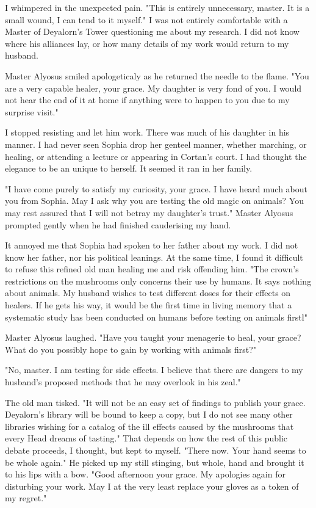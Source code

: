 \documentclass{article}
\begin{document}
I whimpered in the unexpected pain. "This is entirely unnecessary, master. It is a small wound, I can tend to it myself." I was not entirely comfortable with a Master of Deyalorn's Tower questioning me about my research. I did not know where his alliances lay, or how many details of my work would return to my husband.

Master Alyosus smiled apologeticaly as he returned the needle to the flame. "You are a very capable healer, your grace. My daughter is very fond of you. I would not hear the end of it at home if anything were to happen to you due to my surprise visit."

I stopped resisting and let him work. There was much of his daughter in his manner. I had never seen Sophia drop her genteel manner, whether marching, or healing, or attending a lecture or appearing in Cortan's court. I had thought the elegance to be an unique to herself. It seemed it ran in her family.

"I have come purely to satisfy my curiosity, your grace. I have heard much about you from Sophia. May I ask why you are testing the old magic on animals? You may rest assured that I will not betray my daughter's trust." Master Alyosus prompted gently when he had finished cauderising my hand. 

It annoyed me that Sophia had spoken to her father about my work. I did not know her father, nor his political leanings. At the same time, I found it difficult to refuse this refined old man healing me and risk offending him. "The crown's restrictions on the mushrooms only concerns their use by humans. It says nothing about animals. My husband wishes to test different doses for their effects on healers. If he gets his way, it would be the first time in living memory that a systematic study has been conducted on humans before testing on animals firstl" 

Master Alyosus laughed. "Have you taught your menagerie to heal, your grace? What do you possibly hope to gain by working with animals first?" 

"No, master. I am testing for side effects. I believe that there are dangers to my husband's proposed methods that he may overlook in his zeal."

The old man tisked. "It will not be an easy set of findings to publish your grace. Deyalorn's library will be bound to keep a copy, but I do not see many other libraries wishing for a catalog of the ill effects caused by the mushrooms that every Head dreams of tasting." That depends on how the rest of this public debate proceeds, I thought, but kept to myself. "There now. Your hand seems to be whole again." He picked up my still stinging, but whole, hand and brought it to his lips with a bow. "Good afternoon your grace. My apologies again for disturbing your work. May I at the very least replace your gloves as a token of my regret."
\end{document}
